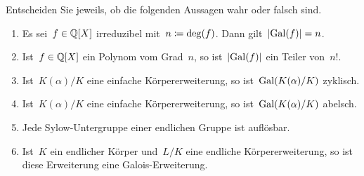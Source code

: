 \documentclass{scrartcl}
\begin{document}
\begin{exercise}[subtitle = {Erstklausur~18/19, Zweitklausur~19/20}]
  Entscheiden Sie jeweils, ob die folgenden Aussagen wahr oder falsch sind.
  \begin{enumerate}
    \item
      Es sei~$f \in \mathbb{Q}[X]$ irreduzibel mit~$n \coloneqq \deg(f)$.
      Dann gilt~$\lvert \operatorname{Gal}(f) \rvert = n$.
    \item
      Ist~$f \in \mathbb{Q}[X]$ ein Polynom vom Grad~$n$, so ist~$\lvert \operatorname{Gal}(f) \rvert$ ein Teiler von~$n!$.
    \item
      Ist~$K(\alpha)/K$ eine einfache Körpererweiterung, so ist~$\operatorname{Gal}( K(\alpha) / K )$ zyklisch.
    \item
      Ist~$K(\alpha)/K$ eine einfache Körpererweiterung, so ist~$\operatorname{Gal}( K(\alpha) / K )$ abelsch.
    \item
      Jede Sylow-Untergruppe einer endlichen Gruppe ist auflösbar.
    \item
      Ist~$K$ ein endlicher Körper und~$L/K$ eine endliche Körpererweiterung, so ist diese Erweiterung eine Galois-Erweiterung.
  \end{enumerate}
\end{exercise}
\end{document}
